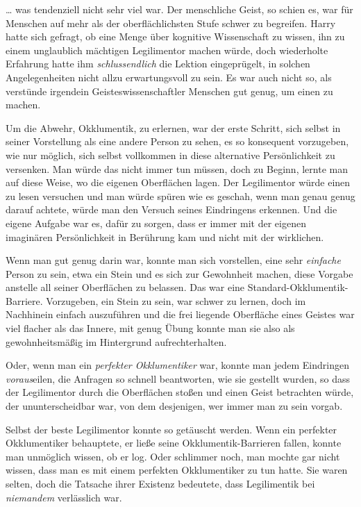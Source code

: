 {… was tendenziell nicht sehr viel war. Der menschliche Geist, so schien es, war für Menschen auf mehr als der oberflächlichsten Stufe schwer zu begreifen. Harry hatte sich gefragt, ob eine Menge über kognitive Wissenschaft zu wissen, ihn zu einem unglaublich mächtigen Legilimentor machen würde, doch wiederholte Erfahrung hatte ihm \emph{schlussendlich} die Lektion eingeprügelt, in solchen Angelegenheiten nicht allzu erwartungsvoll zu sein. Es war auch nicht so, als verstünde irgendein Geisteswissenschaftler Menschen gut genug, um einen zu machen.

Um die Abwehr, Okklumentik, zu erlernen, war der erste Schritt, sich selbst in seiner Vorstellung als eine andere Person zu sehen, es so konsequent vorzugeben, wie nur möglich, sich selbst vollkommen in diese alternative Persönlichkeit zu versenken. Man würde das nicht immer tun müssen, doch zu Beginn, lernte man auf diese Weise, wo die eigenen Oberflächen lagen. Der Legilimentor würde einen zu lesen versuchen und man würde spüren wie es geschah, wenn man genau genug darauf achtete, würde man den Versuch seines Eindringens erkennen. Und die eigene Aufgabe war es, dafür zu sorgen, dass er immer mit der eigenen imaginären Persönlichkeit in Berührung kam und nicht mit der wirklichen.

Wenn man gut genug darin war, konnte man sich vorstellen, eine sehr \emph{einfache} Person zu sein, etwa ein Stein und es sich zur Gewohnheit machen, diese Vorgabe anstelle all seiner Oberflächen zu belassen. Das war eine Standard-Okklumentik-Barriere. Vorzugeben, ein Stein zu sein, war schwer zu lernen, doch im Nachhinein einfach auszuführen und die frei liegende Oberfläche eines Geistes war viel flacher als das Innere, mit genug Übung konnte man sie also als gewohnheitsmäßig im Hintergrund aufrechterhalten.

Oder, wenn man ein \emph{perfekter Okklumentiker} war, konnte man jedem Eindringen \emph{voraus}eilen, die Anfragen so schnell beantworten, wie sie gestellt wurden, so dass der Legilimentor durch die Oberflächen stoßen und einen Geist betrachten würde, der ununterscheidbar war, von dem desjenigen, wer immer man zu sein vorgab.

Selbst der beste Legilimentor konnte so getäuscht werden. Wenn ein perfekter Okklumentiker behauptete, er ließe seine Okklumentik-Barrieren fallen, konnte man unmöglich wissen, ob er log. Oder schlimmer noch, man mochte gar nicht wissen, dass man es mit einem perfekten Okklumentiker zu tun hatte. Sie waren selten, doch die Tatsache ihrer Existenz bedeutete, dass Legilimentik bei \emph{niemandem} verlässlich war.

}
